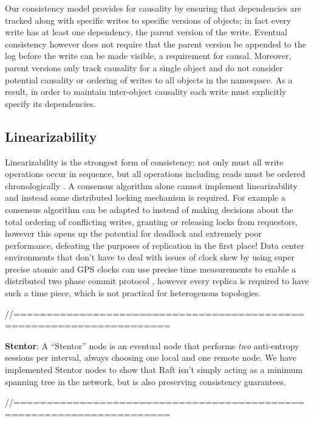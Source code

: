 Our consistency model provides for causality by ensuring that dependencies are tracked along with specific writes to specific versions of objects; in fact every write has at least one dependency, the parent version of the write. Eventual consistency however does not require that the parent version be appended to the log before the write can be made visible, a requirement for causal. Moreover, parent versions only track causality for a single object and do not consider potential causality or ordering of writes to all objects in the namespace. As a result, in order to maintain inter-object causality each write must explicitly specify its dependencies.

\subsection{Linearizability}

Linearizability is the strongest form of consistency; not only must all write operations occur in sequence, but all operations including reads must be ordered chronologically \cite{herlihy_linearizability:_1990}. A consensus algorithm alone cannot implement linearizability and instead some distributed locking mechanism is required. For example a consensus algorithm can be adapted to instead of making decisions about the total ordering of conflicting writes, granting or releasing locks from requestors, however this opens up the potential for deadlock and extremely poor performance, defeating the purposes of replication in the first place! Data center environments that don't have to deal with issues of clock skew by using super precise atomic and GPS clocks can use precise time measurements to enable a distributed two phase commit protocol \cite{corbett_spanner:_2013}, however every replica is required to have such a time piece, which is not practical for heterogenous topologies.

//=====================================================================

\item \textbf{Stentor}: A ``Stentor'' node is an eventual node that performs \textit{two} anti-entropy sessions per interval, always choosing one local and one remote node. We have implemented Stentor nodes to show that Raft isn't simply acting as a minimum spanning tree in the network, but is also preserving consistency guarantees.

  //=====================================================================
  
